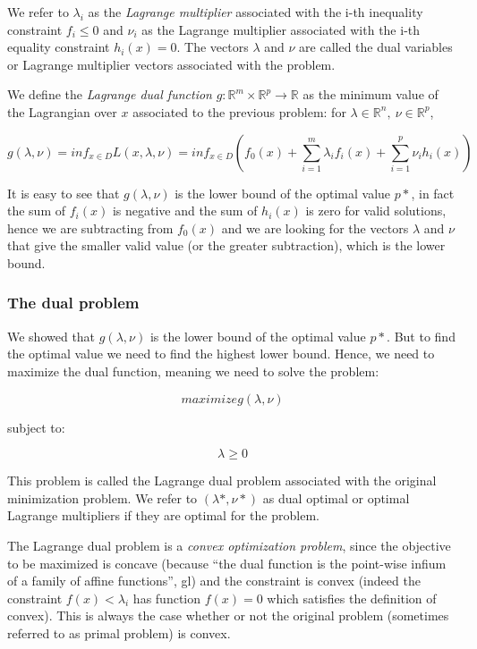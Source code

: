 \documentclass{article}
\begin{document}
We refer to \(\lambda_i\) as the \emph{Lagrange multiplier} associated
with the i-th inequality constraint \(f_i\le 0\) and \(\nu_i\) as the
Lagrange multiplier associated with the i-th equality constraint
\(h_i(x)=0\). The vectors \(\lambda\) and \(\nu\) are called the dual
variables or Lagrange multiplier vectors associated with the problem.

We define the \emph{Lagrange dual function} \(g: \mathbb{R}^m \times
\mathbb{R}^p \rightarrow \mathbb{R}\) as the minimum value of the
Lagrangian over \(x\) associated to the previous problem: for \(\lambda
\in \mathbb{R}^n,\ \nu \in \mathbb{R}^p\),

\[g(\lambda , \nu) = inf_{x\in D} L(x, \lambda , \nu ) = inf_{x\in
D}(f_0(x) + \sum_{i=1}^m \lambda_i f_i(x) + \sum_{i=1}^p \nu_i
h_i(x))\]

It is easy to see that \(g(\lambda , \nu)\) is the lower bound of the
optimal value \(p*\), in fact the sum of \(f_i(x)\) is negative and the
sum of \(h_i(x)\) is zero for valid solutions, hence we are subtracting
from \(f_0(x)\) and we are looking for the vectors \(\lambda\) and
\(\nu\) that give the smaller valid value (or the greater subtraction),
which is the lower bound.

\subsubsection{The dual problem}\label{the-dual-problem}

We showed that \(g(\lambda , \nu)\) is the lower bound of the optimal
value \(p*\). But to find the optimal value we need to find the highest
lower bound. Hence, we need to maximize the dual function, meaning we
need to solve the problem:

\[maximize g(\lambda , \nu)\]

subject to:

\[\lambda \ge 0\]

This problem is called the Lagrange dual problem associated with the
original minimization problem. We refer to \((\lambda *, \nu *)\) as
dual optimal or optimal Lagrange multipliers if they are optimal for the
problem.

The Lagrange dual problem is a \emph{convex optimization problem}, since
the objective to be maximized is concave (because ``the dual function is
the point-wise infium of a family of affine functions'', gl) and the
constraint is convex (indeed the constraint \(f(x) < \lambda_i\) has
function \(f(x)=0\) which satisfies the definition of convex). This is
always the case whether or not the original problem (sometimes referred
to as primal problem) is convex.
\end{document}
